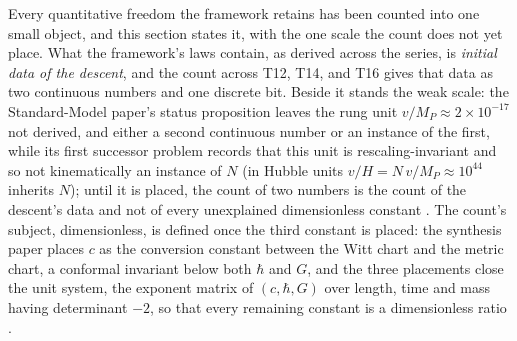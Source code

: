 \documentclass[11pt]{article}
\theoremstyle{definition}
\theoremstyle{plain}
\begin{document}
\label{c:note.programme.setting-measure-two-numbers-one-bit}
Every quantitative freedom the framework retains has been counted into one small object, and this section states it, with the one scale the count does not yet place. What the framework's laws contain, as derived across the series, is \emph{initial data of the descent}, and the count across T12, T14, and T16 gives that data as two continuous numbers and one discrete bit. Beside it stands the weak scale: the Standard-Model paper's status proposition leaves the rung unit $v/M_{P} \approx 2 \times 10^{-17}$ not derived, and either a second continuous number or an instance of the first, while its first successor problem records that this unit is rescaling-invariant and so not kinematically an instance of $N$ (in Hubble units $v/H = N\,v/M_{P} \approx 10^{44}$ inherits $N$); until it is placed, the count of two numbers is the count of the descent's data and not of every unexplained dimensionless constant \cite{ButlerT12}. The count's subject, dimensionless, is defined once the third constant is placed: the synthesis paper places $c$ as the conversion constant between the Witt chart and the metric chart, a conformal invariant below both $\hbar$ and $G$, and the three placements close the unit system, the exponent matrix of $(c, \hbar, G)$ over length, time and mass having determinant $-2$, so that every remaining constant is a dimensionless ratio \cite{ButlerT16}.
\end{document}
